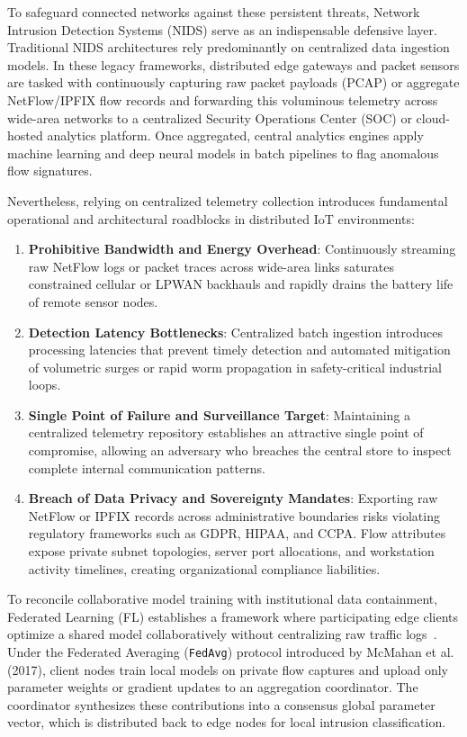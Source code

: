 \documentclass[12pt,a4paper]{report}
\begin{document}
To safeguard connected networks against these persistent threats, Network Intrusion Detection Systems (NIDS) serve as an indispensable defensive layer. Traditional NIDS architectures rely predominantly on centralized data ingestion models. In these legacy frameworks, distributed edge gateways and packet sensors are tasked with continuously capturing raw packet payloads (PCAP) or aggregate NetFlow/IPFIX flow records and forwarding this voluminous telemetry across wide-area networks to a centralized Security Operations Center (SOC) or cloud-hosted analytics platform. Once aggregated, central analytics engines apply machine learning and deep neural models in batch pipelines to flag anomalous flow signatures.

Nevertheless, relying on centralized telemetry collection introduces fundamental operational and architectural roadblocks in distributed IoT environments:
\begin{enumerate}
    \item \textbf{Prohibitive Bandwidth and Energy Overhead}: Continuously streaming raw NetFlow logs or packet traces across wide-area links saturates constrained cellular or LPWAN backhauls and rapidly drains the battery life of remote sensor nodes.
    \item \textbf{Detection Latency Bottlenecks}: Centralized batch ingestion introduces processing latencies that prevent timely detection and automated mitigation of volumetric surges or rapid worm propagation in safety-critical industrial loops.
    \item \textbf{Single Point of Failure and Surveillance Target}: Maintaining a centralized telemetry repository establishes an attractive single point of compromise, allowing an adversary who breaches the central store to inspect complete internal communication patterns.
    \item \textbf{Breach of Data Privacy and Sovereignty Mandates}: Exporting raw NetFlow or IPFIX records across administrative boundaries risks violating regulatory frameworks such as GDPR, HIPAA, and CCPA. Flow attributes expose private subnet topologies, server port allocations, and workstation activity timelines, creating organizational compliance liabilities.
\end{enumerate}

To reconcile collaborative model training with institutional data containment, Federated Learning (FL) establishes a framework where participating edge clients optimize a shared model collaboratively without centralizing raw traffic logs~\cite{mcmahan2017federated}. Under the Federated Averaging (\texttt{FedAvg}) protocol introduced by McMahan et al. (2017), client nodes train local models on private flow captures and upload only parameter weights or gradient updates to an aggregation coordinator. The coordinator synthesizes these contributions into a consensus global parameter vector, which is distributed back to edge nodes for local intrusion classification.
\end{document}
